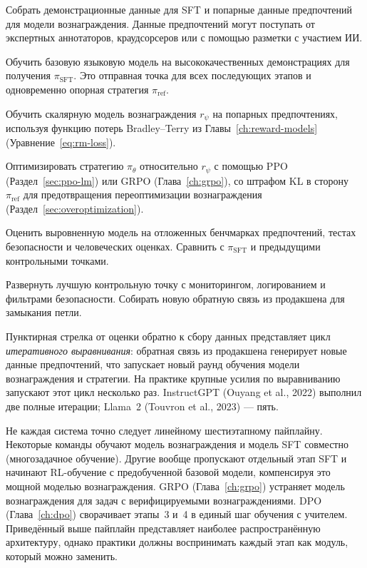 \begin{description}[leftmargin=!,labelwidth=3.5cm]
  \item[Этап 1: Сбор данных] Собрать демонстрационные данные для SFT и попарные данные предпочтений для модели вознаграждения. Данные предпочтений могут поступать от экспертных аннотаторов, краудсорсеров или с помощью разметки с участием ИИ.
  \item[Этап 2: Supervised fine-tuning (SFT)] Обучить базовую языковую модель на высококачественных демонстрациях для получения $\pi_{\mathrm{SFT}}$. Это отправная точка для всех последующих этапов и одновременно опорная стратегия $\pi_{\mathrm{ref}}$.
  \item[Этап 3: Обучение модели вознаграждения] Обучить скалярную модель вознаграждения $r_\psi$ на попарных предпочтениях, используя функцию потерь Bradley--Terry из Главы~\ref{ch:reward-models} (Уравнение~\eqref{eq:rm-loss}).
  \item[Этап 4: RL-обучение] Оптимизировать стратегию $\pi_\theta$ относительно $r_\psi$ с помощью PPO (Раздел~\ref{sec:ppo-lm}) или GRPO (Глава~\ref{ch:grpo}), со штрафом KL в сторону $\pi_{\mathrm{ref}}$ для предотвращения переоптимизации вознаграждения (Раздел~\ref{sec:overoptimization}).
  \item[Этап 5: Оценка] Оценить выровненную модель на отложенных бенчмарках предпочтений, тестах безопасности и человеческих оценках. Сравнить с $\pi_{\mathrm{SFT}}$ и предыдущими контрольными точками.
  \item[Этап 6: Развёртывание] Развернуть лучшую контрольную точку с мониторингом, логированием и фильтрами безопасности. Собирать новую обратную связь из продакшена для замыкания петли.
\end{description}

Пунктирная стрелка от оценки обратно к сбору данных представляет цикл \emph{итеративного выравнивания}: обратная связь из продакшена генерирует новые данные предпочтений, что запускает новый раунд обучения модели вознаграждения и стратегии. На практике крупные усилия по выравниванию запускают этот цикл несколько раз. InstructGPT (Ouyang et al., 2022) выполнил две полные итерации; Llama~2 (Touvron et al., 2023) --- пять.

\begin{remark}
\label{rem:pipeline-variations}
Не каждая система точно следует линейному шестиэтапному пайплайну. Некоторые команды обучают модель вознаграждения и модель SFT совместно (многозадачное обучение). Другие вообще пропускают отдельный этап SFT и начинают RL-обучение с предобученной базовой модели, компенсируя это мощной моделью вознаграждения. GRPO (Глава~\ref{ch:grpo}) устраняет модель вознаграждения для задач с верифицируемыми вознаграждениями. DPO (Глава~\ref{ch:dpo}) сворачивает этапы~3 и~4 в единый шаг обучения с учителем. Приведённый выше пайплайн представляет наиболее распространённую архитектуру, однако практики должны воспринимать каждый этап как модуль, который можно заменить.
\end{remark}

